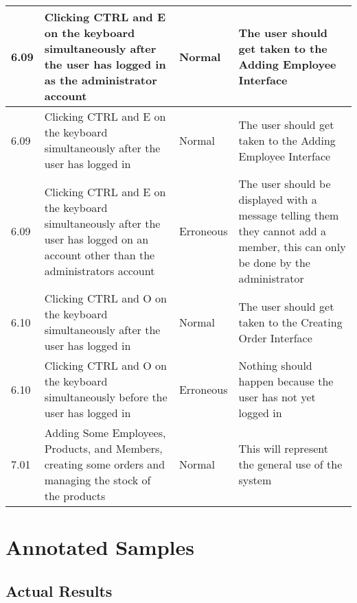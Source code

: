 \begin{flushleft}
\begin{longtable}{|p{1.5cm}|p{2.5cm}|p{2cm}|p{4.5cm}|}
	\rowcolor{light-grey} 6.09 & Clicking CTRL and E on the keyboard simultaneously after the user has logged in as the administrator account & Normal & The user should get taken to the Adding Employee Interface \\ \hline
	\rowcolor{light-grey} 6.09 & Clicking CTRL and E on the keyboard simultaneously after the user has logged in & Normal & The user should get taken to the Adding Employee Interface \\ \hline
	\rowcolor{light-grey} 6.09 & Clicking CTRL and E on the keyboard simultaneously after the user has logged on an account other than the administrators account & Erroneous & The user should be displayed with a message telling them they cannot add a member, this can only be done by the administrator \\ \hline
	\rowcolor{light-grey} 6.10 & Clicking CTRL and O on the keyboard simultaneously after the user has logged in & Normal & The user should get taken to the Creating Order Interface \\ \hline
	\rowcolor{light-grey} 6.10 & Clicking CTRL and O on the keyboard simultaneously before the user has logged in & Erroneous & Nothing should happen because the user has not yet logged in \\ \hline
	\rowcolor{light-grey} 7.01 & Adding Some Employees, Products, and Members, creating some orders and managing the stock of the products & Normal & This will represent the general use of the system \\ \hline
    \end{longtable}
\end{flushleft}

\pagebreak

\section{Annotated Samples}


\pagebreak

\subsection{Actual Results}

